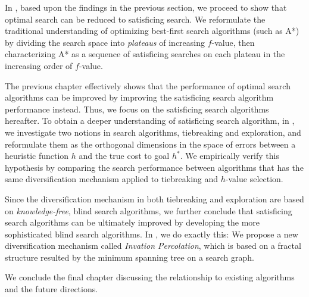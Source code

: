In , based upon the findings in the previous section,
we proceed to show that optimal search can be reduced to satisficing
search. We reformulate the traditional understanding of optimizing
best-first search algorithms (such as A*) by dividing the search space
into \emph{plateaus} of increasing $f$-value, then characterizing A* as a
sequence of satisficing searches on each plateau in the increasing order
of $f$-value.

The previous chapter effectively shows that the performance of optimal
search algorithms can be improved by improving the satisficing search
algorithm performance instead.
Thus, we focus on the satisficing search algorithms hereafter.
To obtain a deeper understanding of satisficing search algorithm,
in , we investigate two notions in search algorithms,
tiebreaking and exploration,
and reformulate them as the orthogonal dimensions in the space
of errors between a heuristic function $h$ and the true cost to goal $h^*$.
We empirically verify this hypothesis by comparing the search performance between algorithms
that has the same diversification mechanism applied to tiebreaking and $h$-value selection.

Since the diversification mechanism in both tiebreaking and exploration
are based on \emph{knowledge-free}, blind search algorithms, we further
conclude that satisficing search algorithms can be ultimately improved
by developing the more sophisticated blind search algorithms.
In , we do exactly this: We propose a new
diversification mechanism called \emph{Invation Percolation}, which is
based on a fractal structure resulted by the minimum spanning tree on a
search graph.

We conclude the final chapter discussing the relationship to existing
algorithms and the future directions.
